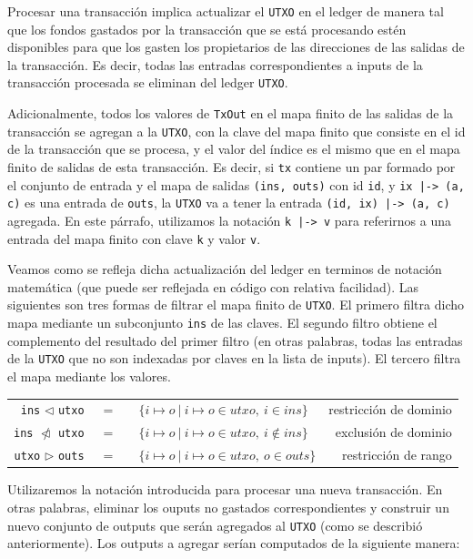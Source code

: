 \documentclass[12pt]{book}
\begin{document}
Procesar una transacción implica actualizar el \texttt{UTXO} en el ledger de manera tal que los fondos gastados por la transacción que se está procesando estén disponibles para que los gasten los propietarios de las direcciones de las salidas de la transacción. Es decir, todas las entradas correspondientes a inputs de la transacción procesada se eliminan del ledger \texttt{UTXO}.

Adicionalmente, todos los valores de \texttt{TxOut} en el mapa finito de las salidas de la transacción se agregan a la \texttt{UTXO}, con la clave del mapa finito que consiste en el id de la transacción que se procesa, y el valor del índice es el mismo que en el mapa finito de salidas de esta transacción. Es decir, si \texttt{tx} contiene un par formado por el conjunto de entrada y el mapa de salidas \texttt{(ins, outs)} con id \texttt{id}, y \texttt{ix |-> (a, c)} es una entrada de \texttt{outs}, la \texttt{UTXO} va a tener la entrada \texttt{(id, ix) |-> (a, c)} agregada. En este párrafo, utilizamos la notación \texttt{k |-> v} para referirnos a una entrada del mapa finito con clave \texttt{k} y valor \texttt{v}.

Veamos como se refleja dicha actualización del ledger en terminos de notación matemática (que puede ser reflejada en código con relativa facilidad). Las siguientes son tres formas de filtrar el mapa finito de \texttt{UTXO}. El primero filtra dicho mapa mediante un subconjunto \texttt{ins} de las claves. El segundo filtro obtiene el complemento del resultado del primer filtro (en otras palabras, todas las entradas de la \texttt{UTXO} que no son indexadas por claves en la lista de inputs). El tercero filtra el mapa mediante los valores.

\begin{center}
    \begin{tabular}{ r @{} c @{} l r }
        \texttt{ins} $\lhd$ \texttt{utxo} &\ =\ \ & $\{ i \mapsto o\ |\ i \mapsto o \in utxo,\ i \in ins \}$ & restricción de dominio \\
        \texttt{ins} $\ntriangleleft$ \texttt{utxo} &\ =\ \ & $\{ i \mapsto o\ |\ i \mapsto o \in utxo,\ i \notin ins \}$ & exclusión de dominio \\
        \texttt{utxo} $\rhd$ \texttt{outs} &\ =\ \ & $\{ i \mapsto o\ |\ i \mapsto o \in utxo,\ o \in outs \}$& restricción de rango
    \end{tabular}
\end{center}

Utilizaremos la notación introducida para procesar una nueva transacción. En otras palabras, eliminar los ouputs no gastados correspondientes y construir un nuevo conjunto de outputs que serán agregados al \texttt{UTXO} (como se describió anteriormente). Los outputs a agregar serían computados de la siguiente manera:
\end{document}
